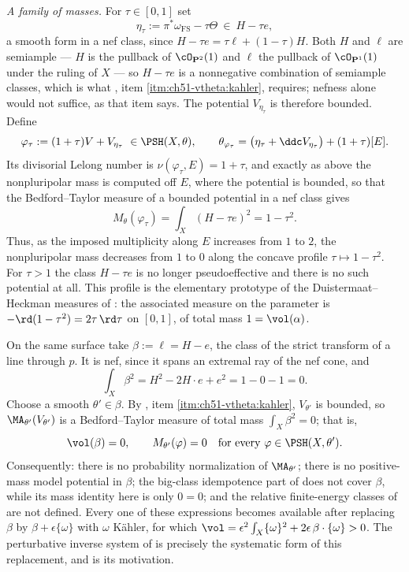 \begin{example}
\emph{A family of masses.}  For \(\tau\in[0,1]\) set
\[
 \eta_\tau:=\pi^*\omega_{\mathrm{FS}}-\tau\Theta
 \ \in\ H-\tau e ,
\]
a smooth form in a nef class, since \(H-\tau e=\tau\ell+(1-\tau)H\).  Both
\(H\) and \(\ell\) are semiample --- \(H\) is the pullback of
\(\cO_{\mathbf P^2}(1)\) and \(\ell\) the pullback of
\(\cO_{\mathbf P^1}(1)\) under the ruling of \(X\) --- so \(H-\tau e\) is a
nonnegative combination of semiample classes, which is what
, item \cref{itm:ch51-vtheta:kahler},
requires; nefness alone would not suffice, as that item says.  The potential
\(V_{\eta_\tau}\) is therefore bounded.
Define
\[
 \varphi_\tau:=(1+\tau)V+V_{\eta_\tau}\ \in\PSH(X,\theta),
 \qquad
 \theta_{\varphi_\tau}
 =\bigl(\eta_\tau+\ddc V_{\eta_\tau}\bigr)+(1+\tau)[E] .
\]
Its divisorial Lelong number is \(\nu(\varphi_\tau,E)=1+\tau\), and
exactly as above the nonpluripolar mass is computed off \(E\), where the
potential is bounded, so that the Bedford--Taylor measure of a bounded
potential in a nef class gives
\[
 M_\theta(\varphi_\tau)
 =\int_X(H-\tau e)^2
 =1-\tau^2 .
\]
Thus, as the imposed multiplicity along \(E\) increases from \(1\) to
\(2\), the nonpluripolar mass decreases from \(1\) to \(0\) along the
concave profile \(\tau\mapsto1-\tau^2\).  For \(\tau>1\) the class
\(H-\tau e\) is no longer pseudoeffective and there is no such potential
at all.  This profile is the elementary prototype of the
Duistermaat--Heckman measures of
: the associated measure on the
parameter is \(-\rd(1-\tau^2)=2\tau\,\rd\tau\) on \([0,1]\), of total mass
\(1=\vol(\alpha)\).
\end{example}

\begin{example}
\label{ex:ch51-nef-zero-volume}
On the same surface take \(\beta:=\ell=H-e\), the class of the strict
transform of a line through \(p\).  It is nef, since it spans an extremal
ray of the nef cone, and
\[
 \int_X\beta^2=H^2-2H\cdot e+e^2=1-0-1=0 .
\]
Choose a smooth \(\theta'\in\beta\).  By
, item \cref{itm:ch51-vtheta:kahler},
\(V_{\theta'}\) is bounded, so \(\MA_{\theta'}(V_{\theta'})\) is a
Bedford--Taylor measure of total mass \(\int_X\beta^2=0\); that is,
\[
 \vol(\beta)=0,
 \qquad
 M_{\theta'}(\varphi)=0
 \quad\text{for every }\varphi\in\PSH(X,\theta').
\]
Consequently: there is no probability normalization of
\(\MA_{\theta'}\); there is no positive-mass model potential in
\(\beta\); the big-class idempotence part of
 does not cover \(\beta\), while its mass
identity here is only \(0=0\); and the relative finite-energy classes of
 are not defined.  Every one of these
expressions becomes available after replacing \(\beta\) by
\(\beta+\epsilon\{\omega\}\) with \(\omega\) K\"ahler, for which
\(\vol=\epsilon^2\int_X\{\omega\}^2+2\epsilon\,\beta\cdot\{\omega\}>0\).
The perturbative inverse system of
 is precisely the systematic form of
this replacement, and  is its motivation.
\end{example}

